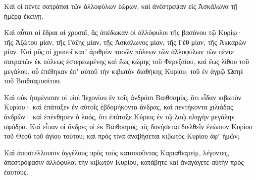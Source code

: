 {Καὶ οἱ πέντε σατράπαι τῶν ἀλλοφύλων ἑώρων, καὶ ἀνέστρεψαν εἰς Ἀσκάλωνα τῇ ἡμέρᾳ ἐκείνῃ.
\par }{\PP {}Καὶ αὗται αἱ ἕδραι αἱ χρυσαῖ, ἃς ἀπέδωκαν οἱ ἀλλόφυλοι τῆς βασάνου τῷ Κυρίῳ· τῆς Ἀζώτου μίαν, τῆς Γάζης μίαν, τῆς Ἀσκάλωνος μίαν, τῆς Γὲθ μίαν, τῆς Ἀκκαρὼν μίαν.
Καὶ μῦς οἱ χρυσοῖ κατʼ ἀριθμὸν πασῶν πόλεων τῶν ἀλλοφύλων τῶν πέντε σατραπῶν ἐκ πόλεως ἐστερεωμένης καὶ ἕως κώμης τοῦ Φερεζαίου, καὶ ἕως λίθου τοῦ μεγάλου, οὗ ἐπέθηκαν ἐπʼ αὐτοῦ τὴν κιβωτὸν διαθήκης Κυρίου, τοῦ ἐν ἀγρῷ Ὠσηὲ τοῦ Βαιθσαμυσίτου.
\par }{\PP {}Καὶ οὐκ ἠσμένισαν οἱ υἱοὶ Ἰεχονίου ἐν τοῖς ἀνδράσι Βαιθσαμὺς, ὅτι εἶδαν κιβωτὸν Κυρίου· καὶ ἐπάταξεν ἐν αὐτοῖς ἑβδομήκοντα ἄνδρας, καὶ πεντήκοντα χιλιάδας ἀνδρῶν· καὶ ἐπένθησεν ὁ λαός, ὅτι ἐπάταξε Κύριος ἐν τῷ λαῷ πληγὴν μεγάλην σφόδρα.
Καὶ εἶπαν οἱ ἄνδρες οἱ ἐκ Βαιθσαμὺς, τίς δυνήσεται διελθεῖν ἐνώπιον Κυρίου τοῦ Θεοῦ τοῦ ἁγίου τούτου; καὶ πρὸς τίνα ἀναβήσεται κιβωτὸς Κυρίου ἀφʼ ἡμῶν;
\par }{\PP {}Καὶ ἀποστέλλουσιν ἀγγέλους πρὸς τοὺς κατοικοῦντας Καριαθιαρεὶμ, λέγοντες, ἀπεστρόφασιν ἀλλόφυλοι τὴν κιβωτὸν Κυρίου, κατάβητε καὶ ἀναγάγετε αὐτὴν πρὸς ἑαυτούς.

}
